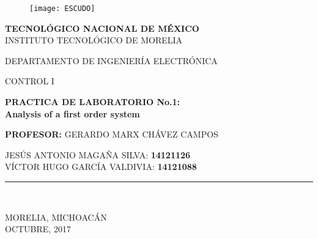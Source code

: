 \documentclass[letterpaper,10pt]{article}
\begin{document}
	
\begin{titlepage}
	
	\begin{center}
		\vspace*{-1in}
		\begin{figure}[htb]
			\centering
			\texttt{[image: ESCUDO]}
		\end{figure}
		
		\textbf{TECNOLÓGICO NACIONAL DE MÉXICO}\\
		\vspace*{0.15in}
		INSTITUTO TECNOLÓGICO DE MORELIA \\
		\vspace*{0.3in}
		\begin{large}
			DEPARTAMENTO DE INGENIERÍA ELECTRÓNICA\\
		\end{large}
		\vspace*{0.2in}
		\begin{large}
			CONTROL I\\
		\end{large}
		\vspace*{0.3in}
		\begin{Large}
			\textbf{PRACTICA DE LABORATORIO No.1: \\
			Analysis of a first order system}\\ 
		\end{Large}
		\vspace*{0.3in}
		\begin{large}
		\textbf{PROFESOR:} GERARDO MARX CHÁVEZ CAMPOS\\
		\end{large}
		\vspace*{0.2in}
		\begin{large}
			JESÚS ANTONIO MAGAÑA SILVA: \textbf{14121126}\\
			VÍCTOR HUGO GARCÍA VALDIVIA: \textbf{14121088}
		\end{large}
		\vspace*{0.3in}
		\rule{80mm}{0.1mm}\\
		\vspace*{0.1in}
		\begin{large}
			MORELIA, MICHOACÁN \\
			OCTUBRE, 2017 \\
		\end{large}
	\end{center}
\end{titlepage}


	\pagebreak
	\justify
	\tableofcontents
	\pagebreak
\end{document}
